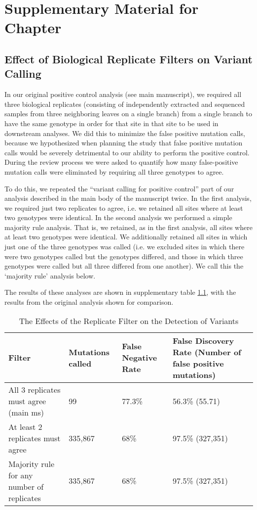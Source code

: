 \chapter{Supplementary Material for Chapter~\protect\phylogenomicref{}}
\label{ch:ch2_supplement}
\newpage
\section{Effect of Biological Replicate Filters on Variant Calling}

In our original positive control analysis (see main manuscript), we required all three biological replicates (consisting of independently extracted and sequenced samples from three neighboring leaves on a single branch) from a single branch to have the same genotype in order for that site in that site to be used in downstream analyses. We did this to minimize the false positive mutation calls, because we hypothesized when planning the study that false positive mutation calls would be severely detrimental to our ability to perform the positive control. During the review process we were asked to quantify how many false-positive mutation calls were eliminated by requiring all three genotypes to agree. 

To do this, we repeated the “variant calling for positive control” part of our analysis described in the main body of the manuscript twice. In the first analysis, we required just two replicates to agree, i.e. we retained all sites where at least two genotypes were identical. In the second analysis we performed a simple majority rule analysis. That is, we retained, as in the first analysis, all sites where at least two genotypes were identical. We additionally retained all sites in which just one of the three genotypes was called (i.e. we excluded sites in which there were two genotypes called but the genotypes differed, and those in which three genotypes were called but all three differed from one another). We call this the ‘majority rule’ analysis below.

The results of these analyses are shown in supplementary table \ref{table:supp_repfilter}, with the results from the original analysis shown for comparison.

\begin{table}
\centering
\begin{tabularx}{\textwidth}{X X X X}
\toprule
Filter & Mutations called & False Negative Rate & False Discovery Rate (Number of false positive mutations) \\
\midrule
All 3 replicates must agree (main ms) & 99 & 77.3\% & 56.3\% (55.71) \\
At least 2 replicates must agree & 335,867 & 68\% & 97.5\% (327,351) \\
Majority rule for any number of replicates & 335,867 & 68\% & 97.5\% (327,351) \\
\bottomrule
\end{tabularx}
\caption{The Effects of the Replicate Filter on the Detection of Variants}
\label{table:supp_repfilter}
\end{table}

